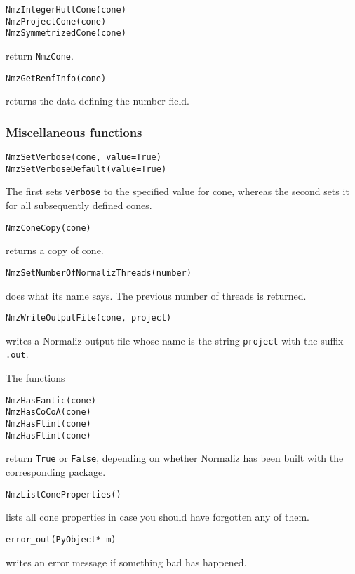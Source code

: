 \documentclass[12pt,a4paper]{scrartcl}
\theoremstyle{definition}
\begin{document}
\begin{small}
\begin{Verbatim}
NmzIntegerHullCone(cone)
NmzProjectCone(cone)
NmzSymmetrizedCone(cone)
\end{Verbatim}
return \verb|NmzCone|.

\begin{Verbatim}
NmzGetRenfInfo(cone)
\end{Verbatim}
returns the data defining the number field.

\subsubsection{Miscellaneous functions}

\begin{Verbatim}
NmzSetVerbose(cone, value=True)
NmzSetVerboseDefault(value=True)
\end{Verbatim}
The first sets \verb|verbose| to the specified value for cone, whereas the second sets it for all subsequently defined cones.

\begin{Verbatim}
NmzConeCopy(cone)
\end{Verbatim}
returns a copy of cone.

\begin{Verbatim}
NmzSetNumberOfNormalizThreads(number)
\end{Verbatim}
does what its name says. The previous number of threads is returned.

\begin{Verbatim}
NmzWriteOutputFile(cone, project)
\end{Verbatim}
writes a Normaliz output file whose name is the string \verb|project| with the suffix \verb|.out|.


The functions
\begin{Verbatim}
NmzHasEantic(cone)
NmzHasCoCoA(cone)
NmzHasFlint(cone)
NmzHasFlint(cone)
\end{Verbatim}
return \verb|True| or \verb|False|, depending on whether Normaliz has been built with the corresponding package.

\begin{Verbatim}
NmzListConeProperties() 
\end{Verbatim}
lists all cone properties in case you should have forgotten any of them.

\begin{Verbatim}
error_out(PyObject* m)
\end{Verbatim}
writes an error message if something bad has happened.


\end{small}
\end{document}
